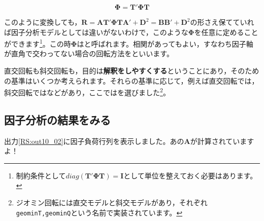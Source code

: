 \documentclass{ltjsbook}
\begin{document}
\[ \bm{\Phi} = \bm{T'\Phi T}\]

このように変換しても，$\bm{R} = \bm{AT'\Phi TA'}+\bm{D}^2=\bm{BB'}+\bm{D}^2$の形さえ保てていれば因子分析モデルとしては違いがないわけで，このような$\bm{\Phi}$を任意に定めることができます\footnote{制約条件として$diag(\bm{T'\Phi T})=\bm{I}$として単位を整えておく必要はあります。}。この時$\bm{\Phi}$はと呼ばれます。相関があってもよい，すなわち因子軸が直角で交わってない場合の回転方法をといいます。

直交回転も斜交回転も，目的は\textbf{解釈をしやすくする}ということにあり，そのための基準はいくつか考えられます。それらの基準に応じて，例えば直交回転では，斜交回転ではなどがあり，ここではを選びました\footnote{ジオミン回転には直交モデルと斜交モデルがあり，それぞれ\verb|geominT,geominQ|という名前で実装されています。}。

\subsection{因子分析の結果をみる}
出力\ref{RS:out10_02}に因子負荷行列を表示しました。あの$\bm{A}$が計算されていますよ！
\end{document}
